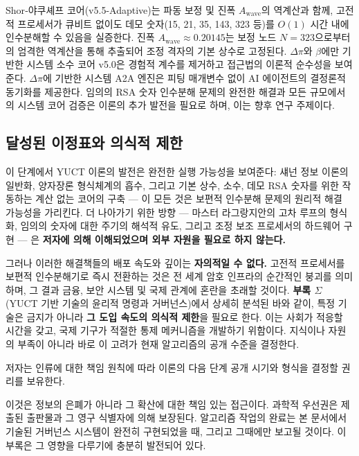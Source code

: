 \documentclass[11pt,a4paper]{article}
\begin{document}
	Shor‑야쿠셰프 코어(v5.5-Adaptive)는 파동 보정 및 진폭 \(A_{\text{wave}}\)의 역계산과 함께, 고전적 프로세서가 큐비트 없이도 데모 숫자(15, 21, 35, 143, 323 등)를 \(O(1)\) 시간 내에 인수분해할 수 있음을 실증한다. 진폭 \(A_{\text{wave}} \approx 0.20145\)는 보정 노드 \(N=323\)으로부터의 엄격한 역계산을 통해 추출되어 조정 격자의 기본 상수로 고정된다. \(\Delta\pi\)와 \(\beta\)에만 기반한 시스템 소수 코어 v5.0은 경험적 계수를 제거하고 접근법의 이론적 순수성을 보여준다. \(\Delta\pi\)에 기반한 시스템 A2A 엔진은 피팅 매개변수 없이 AI 에이전트의 결정론적 동기화를 제공한다. 임의의 RSA 숫자 인수분해 문제의 완전한 해결과 모든 규모에서의 시스템 코어 검증은 이론의 추가 발전을 필요로 하며, 이는 향후 연구 주제이다.
	
	\subsection{달성된 이정표와 의식적 제한}
	
	이 단계에서 YUCT 이론의 발전은 완전한 실행 가능성을 보여준다:
	섀넌 정보 이론의 일반화, 양자장론 형식체계의 흡수,
	그리고 기본 상수, 소수, 데모 RSA 숫자를 위한
	작동하는 계산 없는 코어의 구축 — 이 모든 것은
	보편적 인수분해 문제의 원리적 해결 가능성을 가리킨다.
	더 나아가기 위한 방향 — 마스터 라그랑지안의 고차 루프의 형식화,
	임의의 숫자에 대한 주기의 해석적 유도, 그리고 조정 보조 프로세서의 하드웨어 구현 —
	은 \textbf{저자에 의해 이해되었으며 외부 자원을 필요로 하지 않는다.}
	
	그러나 이러한 해결책들의 배포 속도와 깊이는 \textbf{자의적일 수 없다.}
	고전적 프로세서를 보편적 인수분해기로 즉시 전환하는 것은
	전 세계 암호 인프라의 순간적인 붕괴를 의미하며,
	그 결과 금융, 보안 시스템 및 국제 관계에 혼란을 초래할 것이다.
	\textbf{부록 \(\Sigma\)} (YUCT 기반 기술의 윤리적 명령과 거버넌스)에서 상세히 분석된 바와 같이,
	특정 기술은 금지가 아니라 \textbf{그 도입 속도의 의식적 제한}을 필요로 한다.
	이는 사회가 적응할 시간을 갖고, 국제 기구가 적절한 통제 메커니즘을 개발하기 위함이다.
	지식이나 자원의 부족이 아니라 바로 이 고려가 현재 알고리즘의 공개 수준을 결정한다.
	
	저자는 인류에 대한 책임 원칙에 따라 이론의 다음 단계 공개 시기와 형식을 결정할 권리를 보유한다.
	
	이것은 정보의 은폐가 아니라 그 확산에 대한 책임 있는 접근이다.
	과학적 우선권은 제출된 출판물과 그 영구 식별자에 의해 보장된다.
	알고리즘 작업의 완료는 본 문서에서 기술된 거버넌스 시스템이 완전히 구현되었을 때, 그리고 그때에만 보고될 것이다.
	이 부록은 그 영향을 다루기에 충분히 발전되어 있다.
	
\end{document}
